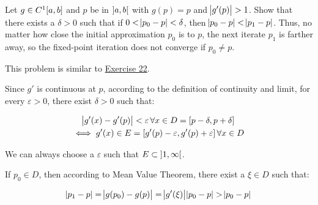 \documentclass[../../../../Assignments]{subfiles}
\begin{document}
\begin{exercise}
    Let \(g \in C^1 \interval{a}{b}\) and \(p\) be in \(\interval[open]{a}{b}\)
    with \(g(p) = p\) and \(\abs{g'(p)} > 1\). Show that there exists a \(\delta
    > 0\) such that if \(0 < \abs{p_0 - p} < \delta\), then \(\abs{p_0 - p} <
    \abs{p_1 - p}\). Thus, no matter how close the initial approximation \(p_0\)
    is to \(p\), the next iterate \(p_1\) is farther away, so the fixed-point
    iteration does not converge if \(p_0 \neq p\).
\end{exercise}

\begin{solution}
    This problem is similar to \hyperref[exer:2.2.22]{Exercise 22}.

    Since \(g'\) is continuous at \(p\), according to the definition of
    continuity and limit, for every \(\varepsilon > 0\), there exist \(\delta >
    0\) such that:

    \begin{gather*}
        \abs{g'(x) - g'(p)} < \varepsilon \, \forall x \in D = \interval{p - \delta}{p + \delta} \\
        \iff g'(x) \in E = \interval{g'(p) - \varepsilon}{g'(p) + \varepsilon} \, \forall x \in D
    \end{gather*}

    We can always choose a \(\varepsilon\) such that \(E \subset
    \interval[open]{1}{\infty}\).

    If \(p_0 \in D\), then according to Mean Value Theorem, there exist a \(\xi
    \in D\) such that:

    \[\abs{p_1 - p} = \abs{g(p_0) - g(p)} = \abs{g'(\xi)} \abs{p_0 - p} > \abs{p_0 - p}\]
\end{solution}
\end{document}
